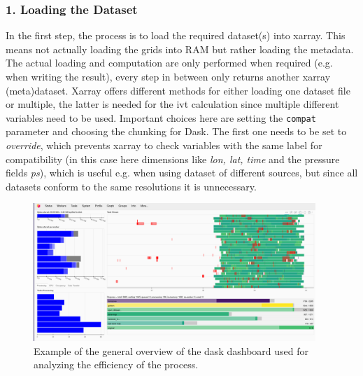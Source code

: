 \subsubsection{1. Loading the Dataset}

In the first step, the process is to load the required dataset(s) into xarray. 
This means not actually loading the grids into RAM but rather loading the metadata. 
The actual loading and computation are only performed when required (e.g. when writing the result), every step in between only returns another xarray (meta)dataset. 
Xarray offers different methods for either loading one dataset file or multiple, the latter is needed for the \ac{ivt} calculation since multiple different variables need to be used. 
Important choices here are setting the \texttt{compat} parameter and choosing the chunking for Dask. 
The first one needs to be set to \textit{override}, which prevents xarray to check variables with the same label for compatibility (in this case here dimensions like \textit{lon, lat, time} and the pressure fields \textit{ps}), which is useful e.g. when using dataset of different sources, but since all datasets conform to the same resolutions it is unnecessary. 

\begin{figure}[htb]
  \begin{center}
    \includegraphics[width=0.95\textwidth]{figures/dask_dashboard_example.png}
  \end{center}
  \caption[Dask Dashboard Process Overview]{Example of the general overview of the dask dashboard used for analyzing the efficiency of the process.}
  \label{fig:dask-dashboard}
\end{figure}



